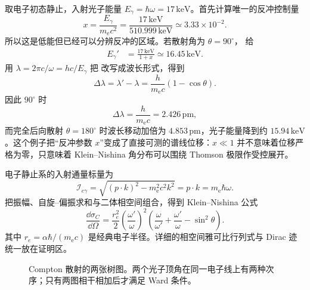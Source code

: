 \begin{exbox}
取电子初态静止，入射光子能量 $E_\gamma=\hbar\omega=17\,\mathrm{keV}$。首先计算唯一的反冲控制量
\begin{equation*}
 x=\frac{E_\gamma}{m_{\mathrm e} c^2}
 =\frac{17\,\mathrm{keV}}{510.999\,\mathrm{keV}}
 \simeq 3.33\times10^{-2}.
\end{equation*}
所以这是低能但已经可以分辨反冲的区域。若散射角为 $\theta=90^\circ$， 给
\begin{align*}
 E_\gamma'
 &=\frac{17\,\mathrm{keV}}{1+x}
 \simeq16.45\,\mathrm{keV}.
\end{align*}
用 $\lambda=2\pi c/\omega=h c/E_\gamma$ 把 改写成波长形式，得到
\begin{equation}
 \boxed{
 \Delta\lambda
 =\lambda'-\lambda
 =\frac{h}{m_{\mathrm e} c}(1-\cos\theta).}
 \label{eq:compton-wavelength-shift-dp61}
\end{equation}
因此 $90^\circ$ 时
\begin{equation*}
 \Delta\lambda=\frac{h}{m_{\mathrm e} c}=2.426\,\mathrm{pm},
\end{equation*}
而完全后向散射 $\theta=180^\circ$ 时波长移动加倍为 $4.853\,\mathrm{pm}$，光子能量降到约 $15.94\,\mathrm{keV}$。这个例子把“反冲参数 $x$”变成了直接可测的谱线位移：$x\ll1$ 并不意味着位移严格为零，只意味着 Klein--Nishina 角分布可以围绕 Thomson 极限作受控展开。
\end{exbox}

电子静止系的入射通量标量为
\begin{equation}
 \mathcal I_{e\gamma}
 =\sqrt{(p\!\cdot k)^2-m_{\mathrm e}^2c^2k^2}
 =p\!\cdot k
 =m_{\mathrm e}\hbar\omega.
 \label{eq:compton-invariant-flux-r14}
\end{equation}
把振幅、自旋--偏振求和与二体相空间组合，得到 Klein--Nishina 公式
\begin{equation}
 \boxed{
 \frac{\dd\sigma_C}{\dd\Omega}
 =\frac{r_e^2}{2}
 \left(\frac{\omega'}{\omega}\right)^2
 \left(
 \frac\omega{\omega'}+\frac{\omega'}\omega-\sin^2\theta
 \right).}
 \label{eq:klein-nishina-SI}
\end{equation}
其中 \(r_e=\alpha\hbar/(m_{\mathrm e} c)\) 是经典电子半径。详细的相空间雅可比行列式与 Dirac 迹统一放在证明区。

\begin{figure}[htbp]
 \centering
 
 \caption{Compton 散射的两张树图。两个光子顶角在同一电子线上有两种次序；只有两图相干相加后才满足 Ward 条件。}
 \label{fig:compton-two}
\end{figure}

